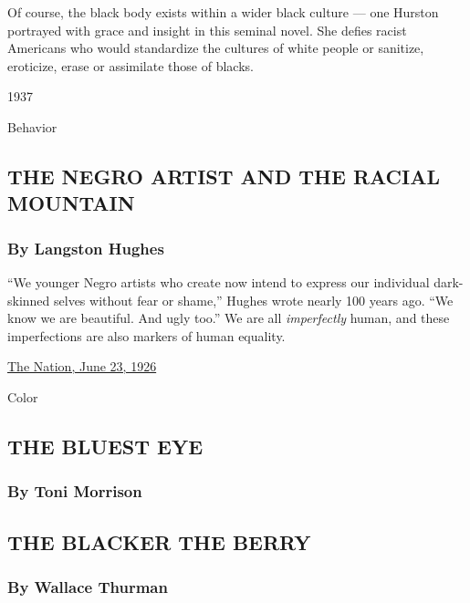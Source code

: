 Of course, the black body exists within a wider black culture --- one
Hurston portrayed with grace and insight in this seminal novel. She
defies racist Americans who would standardize the cultures of white
people or sanitize, eroticize, erase or assimilate those of blacks.

1937

Behavior

\hypertarget{the-negro-artist-and-the-racial-mountain}{%
\subsection{THE NEGRO ARTIST AND THE RACIAL
MOUNTAIN}\label{the-negro-artist-and-the-racial-mountain}}

\hypertarget{by-langston-hughes}{%
\subsubsection{\texorpdfstring{\textbf{By Langston
Hughes}}{By Langston Hughes}}\label{by-langston-hughes}}

``We younger Negro artists who create now intend to express our
individual dark-skinned selves without fear or shame,'' Hughes wrote
nearly 100 years ago. ``We know we are beautiful. And ugly too.'' We are
all \emph{imperfectly} human, and these imperfections are also markers
of human equality.

\href{http://www.hartford-hwp.com/archives/45a/360.html}{The Nation,
June 23, 1926}

Color

\hypertarget{the-bluest-eye}{%
\subsection{THE BLUEST EYE}\label{the-bluest-eye}}

\hypertarget{by-toni-morrison}{%
\subsubsection{\texorpdfstring{\textbf{By Toni
Morrison}}{By Toni Morrison}}\label{by-toni-morrison}}

\hypertarget{the-blacker-the-berry}{%
\subsection{THE BLACKER THE BERRY}\label{the-blacker-the-berry}}

\hypertarget{by-wallace-thurman}{%
\subsubsection{\texorpdfstring{\textbf{By Wallace
Thurman}}{By Wallace Thurman}}\label{by-wallace-thurman}}


